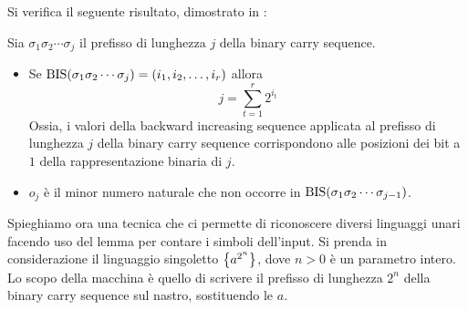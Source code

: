 Si verifica il seguente risultato, dimostrato in \cite{Pighizzini:19:limitedunary}:
\begin{lemma}\label{lem:wit:bis}
	Sia $\sigma_1\sigma_2\cdots\sigma_j$ il prefisso di lunghezza $j$ della binary carry sequence.
	\begin{itemize}
		\item \label{lem:wit:bis:1} Se $\mathrm{BIS}(\sigma_1\sigma_2\cdots\sigma_j)=(i_1,i_2,\dots,i_r)$ allora
		      \begin{equation*}
			      j=\sum_{t=1}^r 2^{i_t}
		      \end{equation*}
		      Ossia, i valori della backward increasing sequence applicata al prefisso di lunghezza $j$ della binary carry sequence corrispondono alle posizioni dei bit a $1$ della rappresentazione binaria di $j$.
		\item \label{lem:wit:bis:2} $o_j$ è il minor numero naturale che non occorre in $\mathrm{BIS}(\sigma_1\sigma_2\cdots\sigma_{j-1})$.
	\end{itemize}
\end{lemma}

Spieghiamo ora una tecnica che ci permette di riconoscere diversi linguaggi unari facendo uso del lemma per contare i simboli dell'input. Si prenda in considerazione il linguaggio singoletto $\left\{ a^{2^n} \right\}$, dove $n>0$ è un parametro intero. Lo scopo della macchina è quello di scrivere il prefisso di lunghezza $2^n$ della binary carry sequence sul nastro, sostituendo le $a$.

